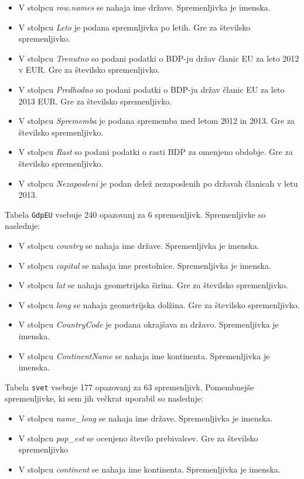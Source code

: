 \documentclass[11pt,a4paper]{article}
\begin{document}
\begin{itemize}
  \item V stolpcu \textit{row.names} se nahaja ime države. Spremenljivka je imenska.
  \item V stolpcu \textit{Leto} je podana spremnljivka po letih. Gre za številsko spremenljivko.
  \item V stolpcu \textit{Trenutno} so podani podatki o BDP-ju držav članic EU za leto 2012 v EUR. Gre za številsko spremenljivko.
  \item V stolpcu \textit{Predhodno} so podani podatki o BDP-ju držav članic EU za leto 2013  EUR. Gre za številsko spremenljivko.
  \item V stolpcu \textit{Sprememba} je podana sprememba med letom 2012 in 2013. Gre za številsko spremenljivko.
  \item V stolpcu \textit{Rast} so podani podatki o rasti BDP za omenjeno obdobje. Gre za številsko spremenljivko.
  \item V stolpcu \textit{Nezaposleni} je podan delež nezaposlenih po državah članicah v letu 2013.
\end{itemize}

Tabela \verb|GdpEU| vsebuje 240 opazovanj za 6 spremenljivk. Spremenljivke so naslednje:

\begin{itemize}
  \item V stolpcu \textit{country} se nahaja ime države. Spremenljivka je imenska.
  \item V stolpcu \textit{capital} se nahaja ime prestolnice. Spremenljivka je imenska.
  \item V stolpcu \textit{lat} se nahaja geometrijska širina. Gre za številsko spremenljivko.
  \item V stolpcu \textit{long} se nahaja geometrijska dolžina. Gre za številsko spremenljivko.
  \item V stolpcu \textit{CountryCode} je podana okrajšava za državo. Spremenljivka je imenska.
  \item V stolpcu \textit{ContinentName} se nahaja ime kontinenta. Spremenljivka je imenska.
\end{itemize}

Tabela \verb|svet| vsebuje 177 opazovanj za 63 spremenljivk. Pomembnejše spremenljivke, ki sem jih večkrat uporabil so naslednje:

\begin{itemize}
  \item V stolpcu \textit{name_long} se nahaja ime države. Spremenljivka je imenska.
  \item V stolpcu \textit{pop_est} se ocenjeno število prebivalcev. Gre za številsko spremenljivko
  \item V stolpcu \textit{continent} se nahaja ime kontinenta. Spremenljivka je imenska.
\end{itemize}
\end{document}
